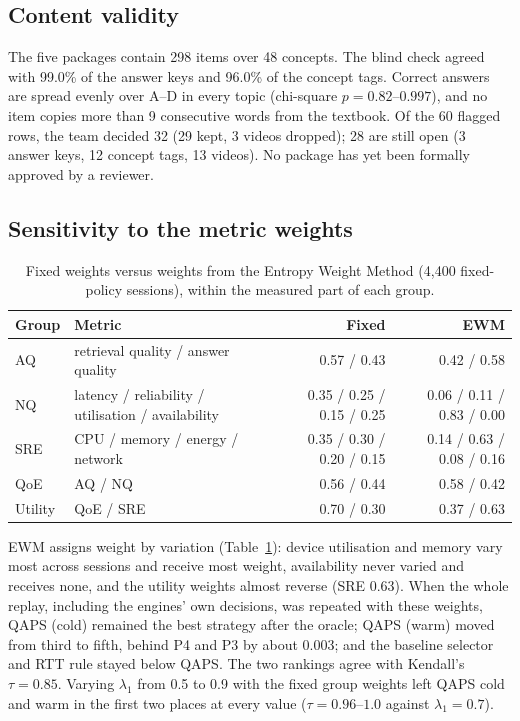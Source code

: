 \subsection{Content validity}
\label{sec:res-content}

The five packages contain 298 items over 48 concepts. The blind check agreed with 99.0\% of the answer
keys and 96.0\% of the concept tags. Correct answers are spread evenly over A--D in every topic
(chi-square $p=0.82$--$0.997$), and no item copies more than 9 consecutive words from the textbook. Of the
60 flagged rows, the team decided 32 (29 kept, 3 videos dropped); 28 are still open (3 answer keys, 12
concept tags, 13 videos). No package has yet been formally approved by a reviewer.

\subsection{Sensitivity to the metric weights}
\label{sec:res-ewm}

\begin{table}[htbp]
  \centering
  \caption{Fixed weights versus weights from the Entropy Weight Method (4{,}400 fixed-policy sessions),
    within the measured part of each group.}
  \label{tab:ewm}
  \begin{tabular}{llrr}
    \toprule
    Group & Metric & Fixed & EWM \\
    \midrule
    AQ & retrieval quality / answer quality & 0.57 / 0.43 & 0.42 / 0.58 \\
    NQ & latency / reliability / utilisation / availability & 0.35 / 0.25 / 0.15 / 0.25 & 0.06 / 0.11 / 0.83 / 0.00 \\
    SRE & CPU / memory / energy / network & 0.35 / 0.30 / 0.20 / 0.15 & 0.14 / 0.63 / 0.08 / 0.16 \\
    QoE & AQ / NQ & 0.56 / 0.44 & 0.58 / 0.42 \\
    Utility & QoE / SRE & 0.70 / 0.30 & 0.37 / 0.63 \\
    \bottomrule
  \end{tabular}
\end{table}

EWM assigns weight by variation (Table~\ref{tab:ewm}): device utilisation and memory vary most across
sessions and receive most weight, availability never varied and receives none, and the utility weights
almost reverse (SRE 0.63). When the whole replay, including the engines' own decisions, was repeated with
these weights, QAPS (cold) remained the best strategy after the oracle; QAPS (warm) moved from third to
fifth, behind P4 and P3 by about 0.003; and the baseline selector and RTT rule stayed below QAPS. The
two rankings agree with Kendall's $\tau=0.85$. Varying $\lambda_1$ from 0.5 to 0.9 with the fixed group
weights left QAPS cold and warm in the first two places at every value ($\tau=0.96$--$1.0$ against
$\lambda_1=0.7$).

